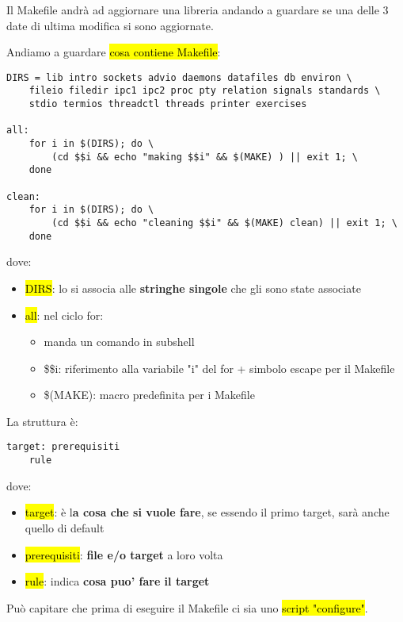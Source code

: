Il Makefile andrà ad aggiornare una libreria andando a guardare se una delle 3 date di ultima modifica si sono aggiornate.


Andiamo a guardare \hl{cosa contiene Makefile}:

\begin{lstlisting}
DIRS = lib intro sockets advio daemons datafiles db environ \
	fileio filedir ipc1 ipc2 proc pty relation signals standards \
	stdio termios threadctl threads printer exercises

all:
	for i in $(DIRS); do \
		(cd $$i && echo "making $$i" && $(MAKE) ) || exit 1; \
	done

clean:
	for i in $(DIRS); do \
		(cd $$i && echo "cleaning $$i" && $(MAKE) clean) || exit 1; \
	done
\end{lstlisting}

dove:
\begin{itemize}
	\item \hl{DIRS}: lo si associa alle \textbf{stringhe singole} che gli sono state associate
	\item \hl{all}: nel ciclo for:
		\begin{itemize}
			\item manda un comando in subshell
			\item \$\$i: riferimento alla variabile "i" del for + simbolo escape per il Makefile
			\item \$(MAKE): macro predefinita per i Makefile
		\end{itemize}
 
\end{itemize}

La struttura è:

\begin{lstlisting}
target: prerequisiti
	rule
\end{lstlisting}

dove:

\begin{itemize}
	\item \hl{target}: è l\textbf{a cosa che si vuole fare}, se essendo il primo target, sarà anche quello di default
	\item \hl{prerequisiti}: \textbf{file e/o target} a loro volta
	\item \hl{rule}: indica \textbf{cosa puo' fare il target}
\end{itemize}

Può capitare che prima di eseguire il Makefile ci sia uno \hl{script "configure"}. 

